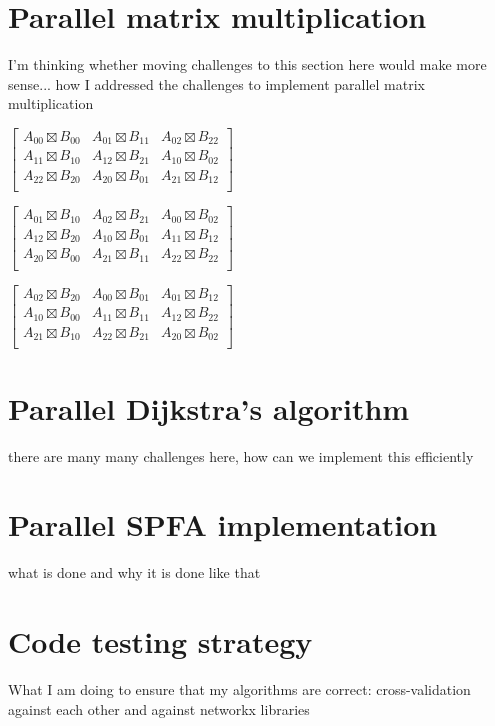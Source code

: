 \documentclass[12pt,a4paper,twoside,openright]{report}
\begin{document}
\section{Parallel matrix multiplication}
I'm thinking whether moving challenges to this section here would make more sense... 
how I addressed the challenges to implement parallel matrix multiplication

$\begin{bmatrix}
A_{00} \boxtimes B_{00} & A_{01} \boxtimes B_{11} & A_{02} \boxtimes B_{22} \\
A_{11} \boxtimes B_{10} & A_{12} \boxtimes B_{21} & A_{10} \boxtimes B_{02} \\
A_{22} \boxtimes B_{20} & A_{20} \boxtimes B_{01} & A_{21} \boxtimes B_{12} \\
\end{bmatrix}$

$\begin{bmatrix}
A_{01} \boxtimes B_{10} & A_{02} \boxtimes B_{21} & A_{00} \boxtimes B_{02} \\
A_{12} \boxtimes B_{20} & A_{10} \boxtimes B_{01} & A_{11} \boxtimes B_{12} \\
A_{20} \boxtimes B_{00} & A_{21} \boxtimes B_{11} & A_{22} \boxtimes B_{22} \\
\end{bmatrix}$

$\begin{bmatrix}
A_{02} \boxtimes B_{20} & A_{00} \boxtimes B_{01} & A_{01} \boxtimes B_{12} \\
A_{10} \boxtimes B_{00} & A_{11} \boxtimes B_{11} & A_{12} \boxtimes B_{22} \\
A_{21} \boxtimes B_{10} & A_{22} \boxtimes B_{21} & A_{20} \boxtimes B_{02} \\
\end{bmatrix}$

\section{Parallel Dijkstra's algorithm}
there are many many challenges here, how can we implement this efficiently

\section{Parallel SPFA implementation}
what is done and why it is done like that

\section{Code testing strategy}
What I am doing to ensure that my algorithms are correct: cross-validation against each other and against networkx libraries
\end{document}
